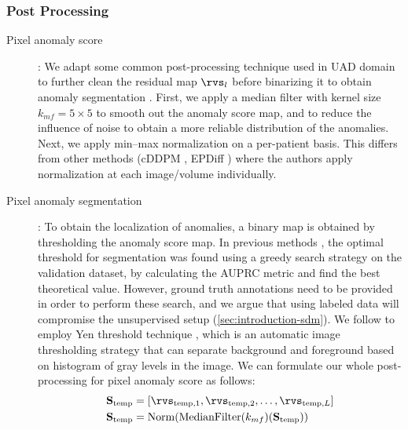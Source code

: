 \subsubsection{Post Processing}
\label{sec:post-process}
\begin{description}
    \item[Pixel anomaly score]: We adapt some common post-processing technique used in UAD domain to further clean the residual map $\rvs_{l}$ before binarizing it to obtain anomaly segmentation \cite{behrendt2025cDDPM, baur_autoencoders_2020}. First, we apply a median filter with kernel size $k_{mf} = 5 \times 5$ to smooth out the anomaly score map, and to reduce the influence of noise to obtain a more reliable distribution of the anomalies. Next, we apply min–max normalization on a per-patient basis. This differs from other methods (cDDPM \cite{behrendt2025cDDPM}, EPDiff \cite{wangEPDiffErasurePerception2025}) where the authors apply normalization at each image/volume individually. 
    \item[Pixel anomaly segmentation]: To obtain the localization of anomalies, a binary map is obtained by thresholding the anomaly score map. In previous methods \cite{autoDDPM, behrendt2025cDDPM, DDAD}, the optimal threshold for segmentation was found using a greedy search strategy on the validation dataset, by calculating the AUPRC metric and find the best theoretical value. However, ground truth annotations need to be provided in order to perform these search, and we argue that using labeled data will compromise the unsupervised setup (\cref{sec:introduction-sdm}). We follow \cite{wangEPDiffErasurePerception2025} to employ Yen threshold technique \cite{YenThreshold}, which is an automatic image thresholding strategy that can separate background and foreground based on histogram of gray levels in the image. We can formulate our whole post-processing for pixel anomaly score as follows: 
    \begin{equation}
    \label{eq:post-process-pixel}
        \begin{aligned}
            \mathbf{S}_{\text{temp}} &= [\rvs_{\text{temp},1}, \rvs_{\text{temp},2}, \dots, \rvs_{\text{temp},L}] \\
            \mathbf{S}_{\text{temp}} &= \mathrm{Norm} (\mathrm{MedianFilter}(k_{mf})(\mathbf{S}_{\text{temp}})) \\

\end{aligned}
\end{equation}
\end{description}
